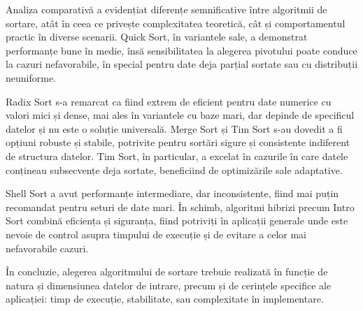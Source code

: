 \documentclass[12pt]{article}
\begin{document}
\begin{justify}
        Analiza comparativă a evidențiat diferențe semnificative între algoritmii de sortare, atât în ceea ce privește complexitatea teoretică, cât și comportamentul practic în diverse scenarii. Quick Sort, în variantele sale, a demonstrat performanțe bune în medie, însă sensibilitatea la alegerea pivotului poate conduce la cazuri nefavorabile, în special pentru date deja parțial sortate sau cu distribuții neuniforme.

Radix Sort s-a remarcat ca fiind extrem de eficient pentru date numerice cu valori mici și dense, mai ales în variantele cu baze mari, dar depinde de specificul datelor și nu este o soluție universală. Merge Sort și Tim Sort s-au dovedit a fi opțiuni robuste și stabile, potrivite pentru sortări sigure și consistente indiferent de structura datelor. Tim Sort, în particular, a excelat în cazurile în care datele conțineau subsecvențe deja sortate, beneficiind de optimizările sale adaptative.

Shell Sort a avut performanțe intermediare, dar inconsistente, fiind mai puțin recomandat pentru seturi de date mari. În schimb, algoritmi hibrizi precum Intro Sort combină eficiența și siguranța, fiind potriviți în aplicații generale unde este nevoie de control asupra timpului de execuție și de evitare a celor mai nefavorabile cazuri.

În concluzie, alegerea algoritmului de sortare trebuie realizată în funcție de natura și dimensiunea datelor de intrare, precum și de cerințele specifice ale aplicației: timp de execuție, stabilitate, sau complexitate în implementare. \end{justify}
\end{document}
